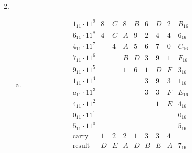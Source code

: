 \documentclass[a4paper, 10pt]{article}
\begin{document}
\begin{enumerate}
\begin{enumerate}[1.]
\begin{enumerate}[(a)]
\[\begin{array}{ccccccc}
				                  \end{array}
			                  \]
		            \end{enumerate}
		      \item \begin{enumerate}[(a)]
			            \item \[
				                  \begin{array}{c|cccccccc}
					                  1_{11} \cdot 11^{9} & 8 & C & 8 & B & 6 & D & 2 & B_{16} \\
					                  6_{11} \cdot 11^{8} & 4 & C & A & 9 & 2 & 4 & 4 & 6_{16} \\
					                  4_{11} \cdot 11^{7} &   & 4 & A & 5 & 6 & 7 & 0 & C_{16} \\
					                  7_{11} \cdot 11^{6} &   &   & B & D & 3 & 9 & 1 & F_{16} \\
					                  9_{11} \cdot 11^{5} &   &   & 1 & 6 & 1 & D & F & 3_{16} \\
					                  1_{11} \cdot 11^{4} &   &   &   &   & 3 & 9 & 3 & 1_{16} \\
					                  a_{11} \cdot 11^{3} &   &   &   &   & 3 & 3 & F & E_{16} \\
					                  4_{11} \cdot 11^{2} &   &   &   &   &   & 1 & E & 4_{16} \\
					                  0_{11} \cdot 11^{1} &   &   &   &   &   &   &   & 0_{16} \\
					                  5_{11} \cdot 11^{0} &   &   &   &   &   &   &   & 5_{16} \\
					                  \hline
					                  \text{carry}   & 1 & 2 & 2 & 1 & 3 & 3 & 4 &   \\
					                  \text{result}  & D & E & A & D & B & E & A & 7_{16} \\
				                  \end{array}
			                  \]
		            \end{enumerate}
	      \end{enumerate}
\end{enumerate}
\end{document}
